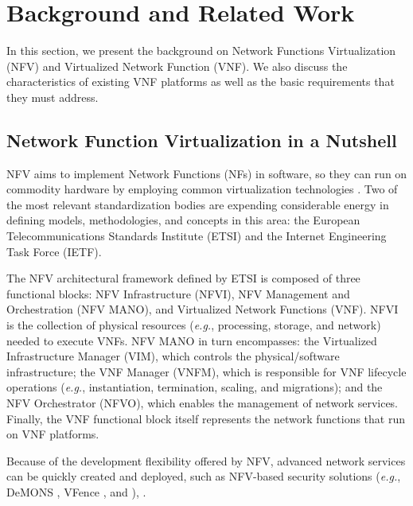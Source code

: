 \section{Background and Related Work} \label{BACK}

In this section, we present the background on Network Functions Virtualization (NFV) and Virtualized Network Function (VNF). We also discuss the characteristics of existing VNF platforms as well as the basic requirements that they must address.

\subsection{Network Function Virtualization in a Nutshell} \label{VISAO}

NFV aims to implement Network Functions (NFs) in software, so they can run on commodity hardware by employing common virtualization technologies \cite{ETSI-2012}. Two of the most relevant standardization bodies are expending considerable energy in defining models, methodologies, and concepts in this area: the European Telecommunications Standards Institute (ETSI) and the Internet Engineering Task Force (IETF).

The NFV architectural framework \cite{GS-2014} defined by ETSI is composed of three functional blocks: NFV Infrastructure (NFVI), NFV Management and Orchestration (NFV MANO), and Virtualized Network Functions (VNF). NFVI is the collection of physical resources (\textit{e.g.}, processing, storage, and network) needed to execute VNFs. NFV MANO in turn encompasses: the Virtualized Infrastructure Manager (VIM), which controls the physical/software infrastructure; the VNF Manager (VNFM), which is responsible for VNF lifecycle operations (\textit{e.g.}, instantiation, termination, scaling, and migrations); and the NFV Orchestrator (NFVO), which enables the management of network services. Finally, the VNF functional block itself represents the network functions that run on VNF platforms.

Because of the development flexibility offered by NFV, advanced network services can be quickly created and deployed, such as NFV-based security solutions (\textit{e.g.}, DeMONS \cite{Garcia-2018}, VFence \cite{Jakaria-2016}, and \cite{Cunha-2018}), .


